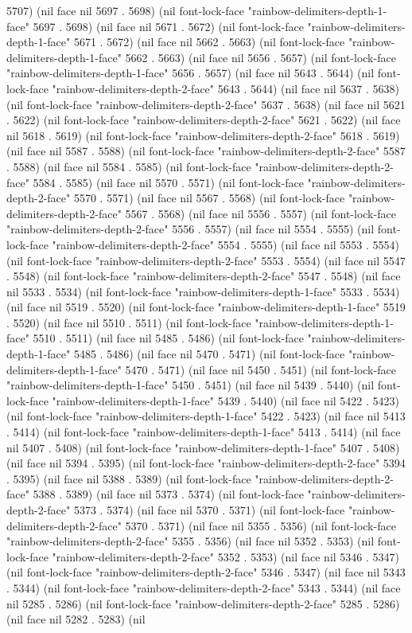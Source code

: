 5707) (nil face nil 5697 . 5698) (nil font-lock-face "rainbow-delimiters-depth-1-face" 5697 . 5698) (nil face nil 5671 . 5672) (nil font-lock-face "rainbow-delimiters-depth-1-face" 5671 . 5672) (nil face nil 5662 . 5663) (nil font-lock-face "rainbow-delimiters-depth-1-face" 5662 . 5663) (nil face nil 5656 . 5657) (nil font-lock-face "rainbow-delimiters-depth-1-face" 5656 . 5657) (nil face nil 5643 . 5644) (nil font-lock-face "rainbow-delimiters-depth-2-face" 5643 . 5644) (nil face nil 5637 . 5638) (nil font-lock-face "rainbow-delimiters-depth-2-face" 5637 . 5638) (nil face nil 5621 . 5622) (nil font-lock-face "rainbow-delimiters-depth-2-face" 5621 . 5622) (nil face nil 5618 . 5619) (nil font-lock-face "rainbow-delimiters-depth-2-face" 5618 . 5619) (nil face nil 5587 . 5588) (nil font-lock-face "rainbow-delimiters-depth-2-face" 5587 . 5588) (nil face nil 5584 . 5585) (nil font-lock-face "rainbow-delimiters-depth-2-face" 5584 . 5585) (nil face nil 5570 . 5571) (nil font-lock-face "rainbow-delimiters-depth-2-face" 5570 . 5571) (nil face nil 5567 . 5568) (nil font-lock-face "rainbow-delimiters-depth-2-face" 5567 . 5568) (nil face nil 5556 . 5557) (nil font-lock-face "rainbow-delimiters-depth-2-face" 5556 . 5557) (nil face nil 5554 . 5555) (nil font-lock-face "rainbow-delimiters-depth-2-face" 5554 . 5555) (nil face nil 5553 . 5554) (nil font-lock-face "rainbow-delimiters-depth-2-face" 5553 . 5554) (nil face nil 5547 . 5548) (nil font-lock-face "rainbow-delimiters-depth-2-face" 5547 . 5548) (nil face nil 5533 . 5534) (nil font-lock-face "rainbow-delimiters-depth-1-face" 5533 . 5534) (nil face nil 5519 . 5520) (nil font-lock-face "rainbow-delimiters-depth-1-face" 5519 . 5520) (nil face nil 5510 . 5511) (nil font-lock-face "rainbow-delimiters-depth-1-face" 5510 . 5511) (nil face nil 5485 . 5486) (nil font-lock-face "rainbow-delimiters-depth-1-face" 5485 . 5486) (nil face nil 5470 . 5471) (nil font-lock-face "rainbow-delimiters-depth-1-face" 5470 . 5471) (nil face nil 5450 . 5451) (nil font-lock-face "rainbow-delimiters-depth-1-face" 5450 . 5451) (nil face nil 5439 . 5440) (nil font-lock-face "rainbow-delimiters-depth-1-face" 5439 . 5440) (nil face nil 5422 . 5423) (nil font-lock-face "rainbow-delimiters-depth-1-face" 5422 . 5423) (nil face nil 5413 . 5414) (nil font-lock-face "rainbow-delimiters-depth-1-face" 5413 . 5414) (nil face nil 5407 . 5408) (nil font-lock-face "rainbow-delimiters-depth-1-face" 5407 . 5408) (nil face nil 5394 . 5395) (nil font-lock-face "rainbow-delimiters-depth-2-face" 5394 . 5395) (nil face nil 5388 . 5389) (nil font-lock-face "rainbow-delimiters-depth-2-face" 5388 . 5389) (nil face nil 5373 . 5374) (nil font-lock-face "rainbow-delimiters-depth-2-face" 5373 . 5374) (nil face nil 5370 . 5371) (nil font-lock-face "rainbow-delimiters-depth-2-face" 5370 . 5371) (nil face nil 5355 . 5356) (nil font-lock-face "rainbow-delimiters-depth-2-face" 5355 . 5356) (nil face nil 5352 . 5353) (nil font-lock-face "rainbow-delimiters-depth-2-face" 5352 . 5353) (nil face nil 5346 . 5347) (nil font-lock-face "rainbow-delimiters-depth-2-face" 5346 . 5347) (nil face nil 5343 . 5344) (nil font-lock-face "rainbow-delimiters-depth-2-face" 5343 . 5344) (nil face nil 5285 . 5286) (nil font-lock-face "rainbow-delimiters-depth-2-face" 5285 . 5286) (nil face nil 5282 . 5283) (nil 